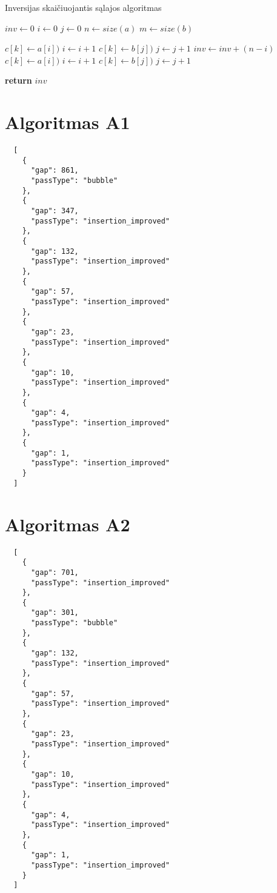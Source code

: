 \documentclass{VUMIFInfKursinis}
\begin{document}
\begin{algorithm}[H]
  \caption{Inversijas skaičiuojantis sąlajos algoritmas}\label{alg:merge}
  \begin{algorithmic}[1]
      \State $inv \gets 0$
      \State $i \gets 0$
      \State $j \gets 0$
      \State $n \gets size(a)$
      \State $m \gets size(b)$
      
              \State $c[k] \gets a[i])$
              \State $i \gets i+1$
            \Else
              \State $c[k] \gets b[j])$
              \State $j \gets j+1$
              \State $inv \gets inv + (n-i)$
            \EndIf
          \Else
            \State $c[k] \gets a[i])$
            \State $i \gets i+1$
          \EndIf
        \Else
          \State $c[k] \gets b[j])$
          \State $j \gets j+1$
        \EndIf
      \EndFor

      \State \textbf{return} $inv$
      
    \EndProcedure
  \end{algorithmic}
\end{algorithm}

\section{Algoritmas A1}

\lstset{language=json}
\begin{lstlisting}
  [
    {
      "gap": 861,
      "passType": "bubble"
    },
    {
      "gap": 347,
      "passType": "insertion_improved"
    },
    {
      "gap": 132,
      "passType": "insertion_improved"
    },
    {
      "gap": 57,
      "passType": "insertion_improved"
    },
    {
      "gap": 23,
      "passType": "insertion_improved"
    },
    {
      "gap": 10,
      "passType": "insertion_improved"
    },
    {
      "gap": 4,
      "passType": "insertion_improved"
    },
    {
      "gap": 1,
      "passType": "insertion_improved"
    }
  ]
\end{lstlisting}

\section{Algoritmas A2}

\lstset{language=json}
\begin{lstlisting}
  [
    {
      "gap": 701,
      "passType": "insertion_improved"
    },
    {
      "gap": 301,
      "passType": "bubble"
    },
    {
      "gap": 132,
      "passType": "insertion_improved"
    },
    {
      "gap": 57,
      "passType": "insertion_improved"
    },
    {
      "gap": 23,
      "passType": "insertion_improved"
    },
    {
      "gap": 10,
      "passType": "insertion_improved"
    },
    {
      "gap": 4,
      "passType": "insertion_improved"
    },
    {
      "gap": 1,
      "passType": "insertion_improved"
    }
  ]
\end{lstlisting}
\end{document}
